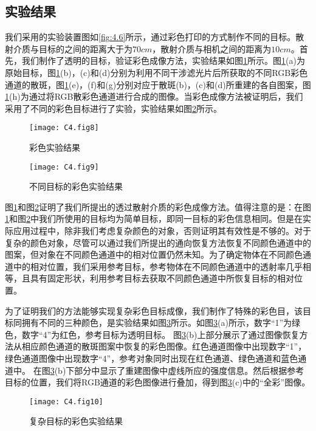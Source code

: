 \subsection{实验结果}

我们采用的实验装置图如\ref{fig:4.6}所示，通过彩色打印的方式制作不同的目标。散射介质与目标的之间的距离大于为$70cm$，散射介质与相机之间的距离为$10cm$。首先，我们制作了透明的目标，验证彩色成像方法，实验结果如图\ref{fig:4.8}所示。图\ref{fig:4.8}(a)为原始目标，图\ref{fig:4.8}(b)，(c)和(d)分别为利用不同干涉滤光片后所获取的不同RGB彩色通道的散斑，图\ref{fig:4.8}(e)，(f)和(g)分别对应于散斑(b)，(c)和(d)所重建的各自图案，图\ref{fig:4.8}(h)为通过将RGB散彩色通道进行合成的图像。当彩色成像方法被证明后，我们采用了不同的彩色目标进行了实验，实验结果如图\ref{fig:4.9}所示。

\begin{figure}[htp]
	\centering
	\texttt{[image: C4.fig8]}
	\caption{彩色实验结果}
	\label{fig:4.8}
\end{figure}
\begin{figure}[htp]
	\centering
	\texttt{[image: C4.fig9]}
	\caption{不同目标的彩色实验结果}
	\label{fig:4.9}
\end{figure}

图\ref{fig:4.8}和图\ref{fig:4.9}证明了我们所提出的透过散射介质的彩色成像方法。值得注意的是：在图\ref{fig:4.8}和图\ref{fig:4.9}中我们所使用的目标均为简单目标，即同一目标的彩色信息相同。但是在实际应用过程中，除非我们考虑复杂颜色的对象，否则证明其有效性是不够的。对于复杂的颜色对象，尽管可以通过我们所提出的通向恢复方法恢复不同颜色通道中的图案，但对象在不同颜色通道中的相对位置仍然未知。为了确定物体在不同颜色通道中的相对位置，我们采用参考目标，参考物体在不同颜色通道中的透射率几乎相等，且具有固定形状，利用参考目标去获取不同颜色通道中所恢复目标的相对位置。

为了证明我们的方法能够实现复杂彩色目标成像，我们制作了特殊的彩色目，该目标同拥有不同的三种颜色，是实验结果如图\ref{fig:4.10}所示。如图\ref{fig:4.10}(a)所示，数字“1”为绿色，数字“4”为红色，参考目标为透明目标。 图\ref{fig:4.10}(b)上部分展示了通过图像恢复方法从相应颜色通道的散斑图案中恢复的彩色图像。红色通道图像中出现数字“1”，绿色通道图像中出现数字“4”，参考对象同时出现在红色通道、绿色通道和蓝色通道中。 在图\ref{fig:4.10}(b)下部分中显示了重建图像中虚线所应的强度信息。然后根据参考目标的位置，我们将RGB通道的彩色图像进行叠加，得到图\ref{fig:4.10}(c)中的“全彩”图像。

\begin{figure}[htp]
	\centering
	\texttt{[image: C4.fig10]}
	\caption{复杂目标的彩色实验结果}
	\label{fig:4.10}
\end{figure}

